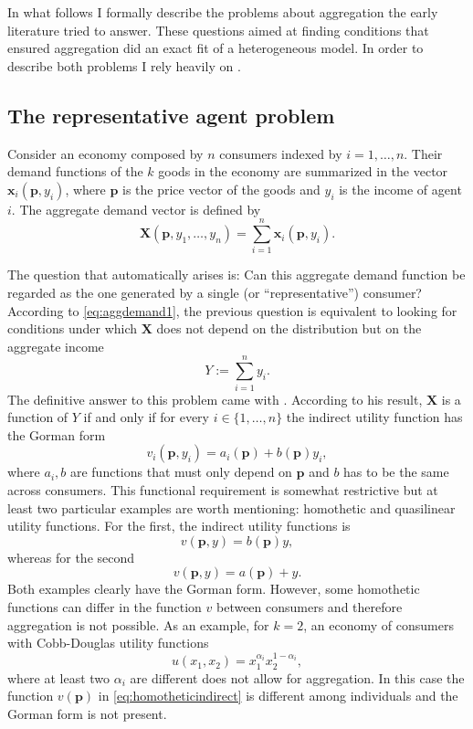 \documentclass[english, a4paper, 12pt]{article}
\begin{document}
In what follows I formally describe the problems about aggregation the early literature tried to answer. These questions aimed at finding conditions that ensured aggregation did an exact fit of a heterogeneous model. In order to describe both problems I rely heavily on \cite{VarianBook}.

\subsection{The representative agent problem} \label{ssec:RepAgent}
Consider an economy composed by $n$ consumers indexed by $i = 1, \ldots, n$. Their demand functions of the $k$ goods in the economy are summarized in the vector $\mathbf{x}_{i}(\mathbf{p}, y_{i})$, where $\mathbf{p}$ is the price vector of the goods and $y_{i}$ is the income of agent $i$. The aggregate demand vector is defined by
	\begin{equation} \label{eq:aggdemand1}
		\mathbf{X}(\mathbf{p}, y_{1}, \ldots, y_{n}) = \sum_{i=1}^{n} \mathbf{x}_{i}(\mathbf{p},y_{i}).
	\end{equation}

The question that automatically arises is: Can this aggregate demand function be regarded as the one generated by a single (or ``representative'') consumer? According to \eqref{eq:aggdemand1}, the previous question is equivalent to looking for conditions under which $\mathbf{X}$ does not depend on the distribution but on the aggregate income
	$$Y := \sum_{i=1}^{n} y_{i}.$$
The definitive answer to this problem came with \cite{Gorman53}. According to his result, $\mathbf{X}$ is a function of $Y$ if and only if for every $i \in \{1,\ldots,n\}$ the indirect utility function has the Gorman form
	$$v_{i}(\mathbf{p}, y_{i}) = a_{i}(\mathbf{p}) + b(\mathbf{p})y_{i},$$ 
where $a_{i}, b$ are functions that must only depend on $\mathbf{p}$ and $b$ has to be the same across consumers. This functional requirement is somewhat restrictive but at least two particular examples are worth mentioning: homothetic and quasilinear utility functions. For the first, the indirect utility functions is
	\begin{equation} \label{eq:homotheticindirect}
		v(\mathbf{p}, y) = b(\mathbf{p})y,
	\end{equation}
whereas for the second
	$$v(\mathbf{p}, y) = a(\mathbf{p}) + y.$$
Both examples clearly have the Gorman form. However, some homothetic functions can differ in the function $v$ between consumers and therefore aggregation is not possible. As an example, for $k = 2$, an economy of consumers with Cobb-Douglas utility functions
	$$u(x_{1}, x_{2}) = x_{1}^{\alpha_{i}}x_{2}^{1-\alpha_{i}},$$
where at least two $\alpha_{i}$ are different does not allow for aggregation. In this case the function $v(\mathbf{p})$ in \eqref{eq:homotheticindirect} is different among individuals and the Gorman form is not present.
\end{document}
